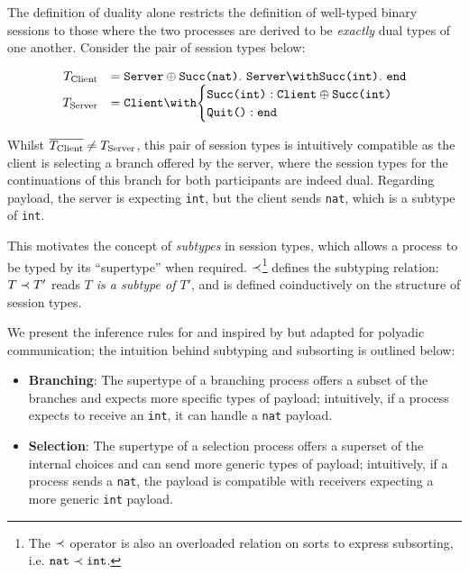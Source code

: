 \begin{prooftree}
\end{prooftree}

The definition of duality alone 
restricts the definition of 
well-typed binary sessions to those
where the two processes are derived to be 
\textit{exactly} dual types of one another. 
Consider the pair of session types below:

\[
\begin{array}{rl}
T_{\text{Client}} &= 
	\tselone{Server}{\tmsg{Succ(nat)}}.~
	\tbraone{Server}{\tmsg{Succ(int)}}.~
	\tend \\
T_{\text{Server}} &= \tbraone{Client}{
\begin{cases}
	\tmsg{Succ(int)}: \tselone{Client}{\tmsg{Succ(int)}} \\
	\tmsg{Quit()}:  \tend \\
\end{cases}
} \\
\end{array}
\]

Whilst $\dual{T_{\text{Client}}} \neq T_{\text{Server}}$, 
this pair of session types is intuitively compatible 
as the client is selecting a branch offered by the server, 
where the session types for the continuations of 
this branch for both participants are indeed dual.
Regarding payload, the server is expecting \texttt{int},
but the client sends \texttt{nat}, which is a subtype of \texttt{int}.

This motivates the concept of \textit{subtypes} in session types,
which allows a process to be typed by its ``supertype'' when required. 
$\subtype$\footnote{
The $\subtype$ operator is also an 
overloaded relation on 
sorts to express subsorting, 
i.e. $\texttt{nat} \subtype \texttt{int}$.
} defines the subtyping relation: 
$T \subtype T'$ reads \textit{$T$ is a subtype of $T'$},
and is defined coinductively on the structure of session types.

We present the inference rules for 
 and 
inspired by \cite{MPST} but adapted for polyadic communication; 
the intuition behind subtyping and subsorting is outlined below:

\begin{itemize}
\item \textbf{Branching}: 
The supertype of a branching process offers 
a subset of the branches and 
expects more specific types of payload; 
intuitively, if a process expects to 
receive an \texttt{int}, 
it can handle a \texttt{nat} payload.

\item \textbf{Selection}: 
The supertype of a selection process offers a 
superset of the internal choices and 
can send more generic types of payload; 
intuitively, if a process sends a \texttt{nat}, 
the payload is compatible with receivers expecting 
a more generic \texttt{int} payload.
\end{itemize}

